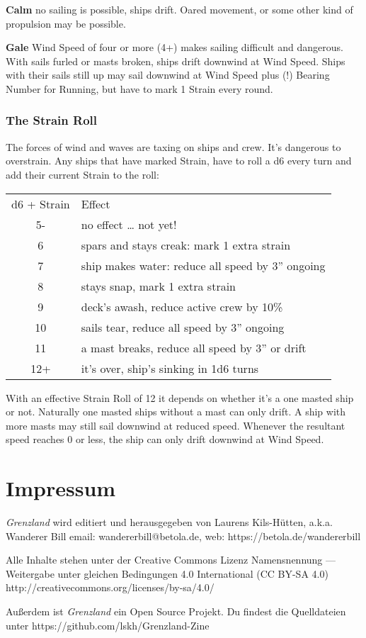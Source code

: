 \documentclass[11pt]{wbzine}
\begin{document}
\begin{multicols}{2}
\textbf{Calm} no sailing is possible, ships drift. Oared movement, or
some other kind of propulsion may be possible.

\textbf{Gale} Wind Speed of four or more (4+) makes sailing difficult
and dangerous. With sails furled or masts broken, ships drift downwind
at Wind Speed. Ships with their sails still up may sail downwind at Wind
Speed plus (!) Bearing Number for Running, but have to mark 1 Strain
every round.

\subsubsection{The Strain Roll}

The forces of wind and waves are taxing on ships and crew. It's
dangerous to overstrain. Any ships that have marked Strain, have to roll
a d6 every turn and add their current Strain to the roll:

\begin{tabularx}{\columnwidth}{cZ}
d6 + Strain & Effect \\
5- & no effect \ldots{} not yet! \\
6 & spars and stays creak: mark 1 extra strain \\
7 & ship makes water: reduce all speed by 3'' ongoing \\
8 & stays snap, mark 1 extra strain \\
9 & deck's awash, reduce active crew by 10\% \\
10 & sails tear, reduce all speed by 3'' ongoing \\
11 & a mast breaks, reduce all speed by 3'' or drift \\
12+ & it's over, ship's sinking in 1d6 turns \\
\end{tabularx}

With an effective Strain Roll of 12 it depends on whether it's a one
masted ship or not. Naturally one masted ships without a mast can only
drift. A ship with more masts may still sail downwind at reduced speed.
Whenever the resultant speed reaches 0 or less, the ship can only drift
downwind at Wind Speed.

\end{multicols}




\section{Impressum}

\textit{Grenzland} wird editiert und
herausgegeben von Laurens Kils-Hütten,
a.k.a. Wanderer Bill
email: wandererbill@betola.de, web: https://betola.de/wandererbill

Alle Inhalte stehen unter der Creative Commons Lizenz
Namensnennung --- Weitergabe unter gleichen Bedingungen 4.0 International
(CC BY-SA 4.0)
http://creativecommons.org/licenses/by-sa/4.0/

Außerdem ist \textit{Grenzland} ein Open Source Projekt. Du
findest die Quelldateien unter https://github.com/lskh/Grenzland-Zine

\end{document}
